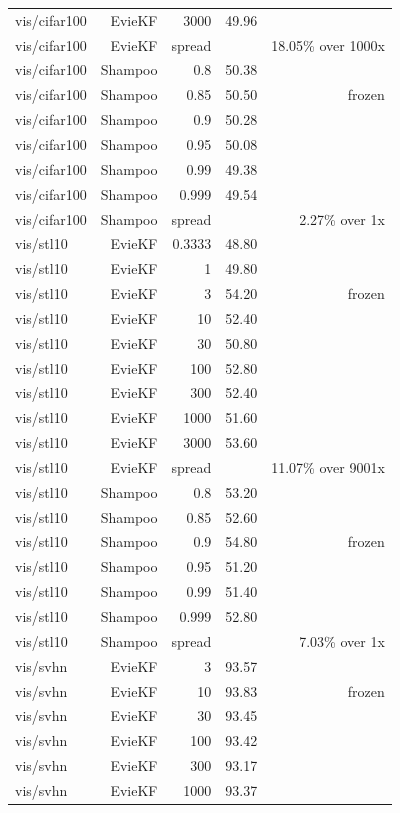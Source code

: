 \begin{table}[t]
\begin{tabular}{lrrrr}
vis/cifar100 & EvieKF & 3000 & 49.96 &  \\
vis/cifar100 & EvieKF & spread &  & 18.05\% over 1000x \\
vis/cifar100 & Shampoo & 0.8 & 50.38 &  \\
vis/cifar100 & Shampoo & 0.85 & 50.50 & frozen \\
vis/cifar100 & Shampoo & 0.9 & 50.28 &  \\
vis/cifar100 & Shampoo & 0.95 & 50.08 &  \\
vis/cifar100 & Shampoo & 0.99 & 49.38 &  \\
vis/cifar100 & Shampoo & 0.999 & 49.54 &  \\
vis/cifar100 & Shampoo & spread &  & 2.27\% over 1x \\
vis/stl10 & EvieKF & 0.3333 & 48.80 &  \\
vis/stl10 & EvieKF & 1 & 49.80 &  \\
vis/stl10 & EvieKF & 3 & 54.20 & frozen \\
vis/stl10 & EvieKF & 10 & 52.40 &  \\
vis/stl10 & EvieKF & 30 & 50.80 &  \\
vis/stl10 & EvieKF & 100 & 52.80 &  \\
vis/stl10 & EvieKF & 300 & 52.40 &  \\
vis/stl10 & EvieKF & 1000 & 51.60 &  \\
vis/stl10 & EvieKF & 3000 & 53.60 &  \\
vis/stl10 & EvieKF & spread &  & 11.07\% over 9001x \\
vis/stl10 & Shampoo & 0.8 & 53.20 &  \\
vis/stl10 & Shampoo & 0.85 & 52.60 &  \\
vis/stl10 & Shampoo & 0.9 & 54.80 & frozen \\
vis/stl10 & Shampoo & 0.95 & 51.20 &  \\
vis/stl10 & Shampoo & 0.99 & 51.40 &  \\
vis/stl10 & Shampoo & 0.999 & 52.80 &  \\
vis/stl10 & Shampoo & spread &  & 7.03\% over 1x \\
vis/svhn & EvieKF & 3 & 93.57 &  \\
vis/svhn & EvieKF & 10 & 93.83 & frozen \\
vis/svhn & EvieKF & 30 & 93.45 &  \\
vis/svhn & EvieKF & 100 & 93.42 &  \\
vis/svhn & EvieKF & 300 & 93.17 &  \\
vis/svhn & EvieKF & 1000 & 93.37 &  \\

\end{tabular}
\end{table}
